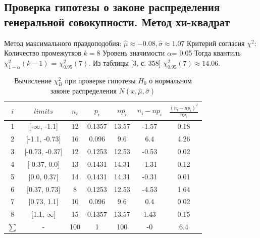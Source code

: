 \documentclass[a4paper,14pt]{article}
\begin{document}
	\subsection{Проверка гипотезы о законе распределения генеральной совокупности. Метод хи-квадрат}
	
	\noindent Метод максимального правдоподобия:
	\newline
	$\hat{\mu} \approx -0.08, \hat{\sigma} \approx 1.07$
	\newline
	Критерий согласия $\chi^{2}$:
	\newline
	Количество промежутков $k = 8$
	\newline
	Уровень значимости $\alpha$= 0.05
	\newline
	Тогда квантиль $\chi^{2}_{1-\alpha}(k-1)$ = $\chi^{2}_{0.95}(7)$. Из таблицы [3, с. 358] $\chi^{2}_{0.95}(7) \approx 14.06$. 
	\begin{table}[H]
		\centering
		\begin{tabular}{| c | c | c | c | c | c | c |}
			\hline
			$i$ & $limits$         &   $n_i$ &    $p_i$ &   $np_i$ &   $n_i - np_i$ &   $\frac{(n_i-np_i)^2}{np_i}$ \\
			\hline
			1 & [-$\infty$, -1.1] &    12 & 0.1357 &  13.57 &        -1.57 &                        0.18 \\
			2 & [-1.1, -0.73]  &    16 & 0.096  &   9.6  &         6.4  &                        4.26  \\
			3 & [-0.73, -0.37] &    12 & 0.1253 &  12.53 &         -0.53 &                        0.02 \\
			4 & [-0.37, 0.0]   &    13 & 0.1431 &  14.31 &         -1.31 &                        0.12 \\
			5 & [0.0, 0.37]    &    14 & 0.1431 &  14.31 &         -0.31 &                        0.01 \\
			6 & [0.37, 0.73]   &    8 & 0.1253 &  12.53 &        -4.53 &                        1.64 \\
			7 & [0.73, 1.1]    &    10 & 0.096  &   9.6  &         0.4  &                        0.02  \\
			8 & [1.1, $\infty$]   &    15 & 0.1357 &  13.57 &        1.43 &                        0.15 \\
			$\sum$ & -              &   100 & 1      & 100    &        -0    &                        6.4 \\
			\hline
		\end{tabular}
		\caption{ Вычисление $\chi^{2}_{B}$ при проверке гипотезы $H_{0}$ о нормальном законе распределения $N(x,\hat{\mu}, \hat{\sigma})$}
		\label{tab:normal_chi_2}
	\end{table} 
	
\end{document}
